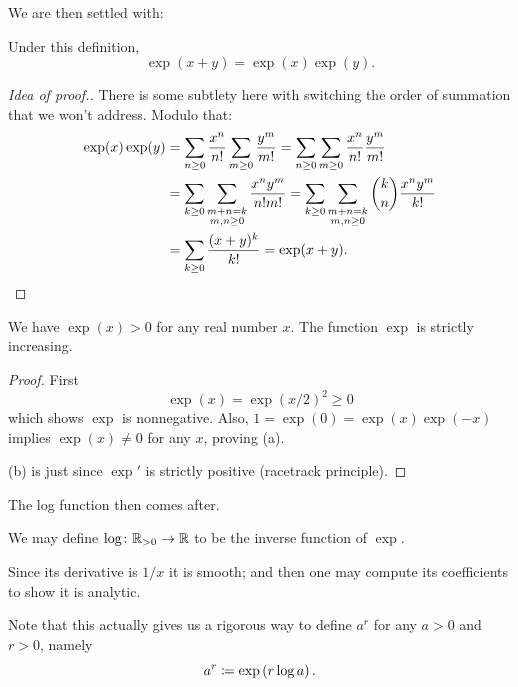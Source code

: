 We are then settled with:
\begin{proposition}
	Under this definition,
	\[ \exp(x+y) = \exp(x) \exp(y). \]
\end{proposition}
\begin{proof}
	[Idea of proof.]
	There is some subtlety here with switching
	the order of summation that we won't address.
	Modulo that:
	\begin{align*}
		\exp(x) \exp(y)
		&= \sum_{n \ge 0} \frac{x^n}{n!}
			\sum_{m \ge 0} \frac{y^m}{m!}
		= \sum_{n \ge 0} \sum_{m \ge 0}
			\frac{x^n}{n!} \frac{y^m}{m!} \\
		&= \sum_{k \ge 0} \sum_{\substack{m+n = k \\ m,n \ge 0}}
			\frac{x^n y^m}{n! m!}
		= \sum_{k \ge 0} \sum_{\substack{m+n = k \\ m,n \ge 0}}
			\binom{k}{n} \frac{x^n y^m}{k!} \\
		&= \sum_{k \ge 0} \frac{(x+y)^k}{k!} = \exp(x+y). \qedhere
	\end{align*}
\end{proof}

\begin{corollary}
	\listhack
	\begin{enumerate}[(a)]
		\ii We have $\exp(x) > 0$ for any real number $x$.
		\ii The function $\exp$ is strictly increasing.
	\end{enumerate}
\end{corollary}
\begin{proof}
	First \[ \exp(x) = \exp(x/2)^2 \ge 0 \]
	which shows $\exp$ is nonnegative.
	Also, $1 = \exp(0) = \exp(x) \exp(-x)$ implies $\exp(x) \neq 0$ for any $x$, proving (a).

	(b) is just since $\exp'$ is strictly positive (racetrack principle).
\end{proof}

The log function then comes after.
\begin{definition}
	We may define $\log \colon \mathbb R_{>0} \to \mathbb R$ to be the inverse function of $\exp$.
\end{definition}
Since its derivative is $1/x$ it is smooth;
and then one may compute its coefficients to show it is analytic.

Note that this actually gives us a rigorous way to define
$a^r$ for any $a > 0$ and $r > 0$, namely
\[ a^r \coloneqq \exp\left( r \log a \right). \]


